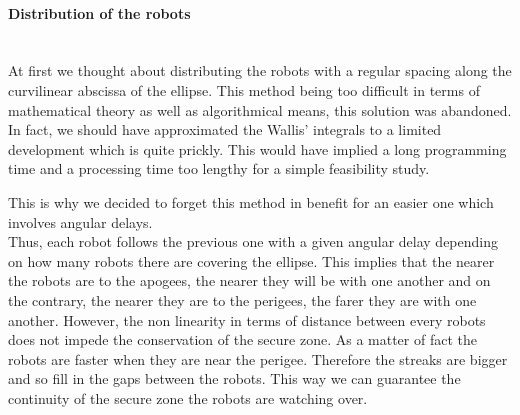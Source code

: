 \paragraph{Distribution of the robots}\mbox{}\\

	At first we thought about distributing the robots with a regular spacing along the curvilinear abscissa of the ellipse. This method being too difficult in terms of mathematical theory as well as algorithmical means, this solution was abandoned. In fact, we should have approximated the Wallis' integrals to a limited development which is quite prickly. This would have implied a long programming time and a processing time too lengthy for a simple feasibility study.

	This is why we decided to forget this method in benefit for an easier one which involves angular delays.\\
Thus, each robot follows the previous one with a given angular delay depending on how many robots there are covering the ellipse. This implies that the nearer the robots are to the apogees, the nearer they will be with one another and on the contrary, the nearer they are to the perigees, the farer they are with one another. However, the non linearity in terms of distance between every robots does not impede the conservation of the secure zone. As a matter of fact the robots are faster when they are near the perigee. Therefore the streaks are bigger and so fill in the gaps between the robots. This way we can guarantee the continuity of the secure zone the robots are watching over.


